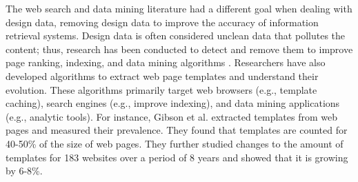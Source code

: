 The web search and data mining literature had a different goal when dealing with design data, removing design data to improve the accuracy of information retrieval systems.
Design data is often considered unclean data that pollutes the content; thus, research has been conducted to detect and remove them to improve page ranking, indexing, and data mining algorithms \cite{bar_2002_WWW, gibson_2005_WWW, chakrabarti_2007_WWW}. 
Researchers have also developed algorithms to extract web page templates and understand their evolution.
These algorithms primarily target web browsers (e.g., template caching), search engines (e.g., improve indexing), and data mining applications (e.g., analytic tools).
For instance, Gibson et al. \cite{gibson_2005_WWW} extracted templates from web pages and measured their prevalence.
They found that templates are counted for 40-50\% of the size of web pages.
They further studied changes to the amount of templates for 183 websites over a period of 8 years and showed that it is growing by 6-8\%.